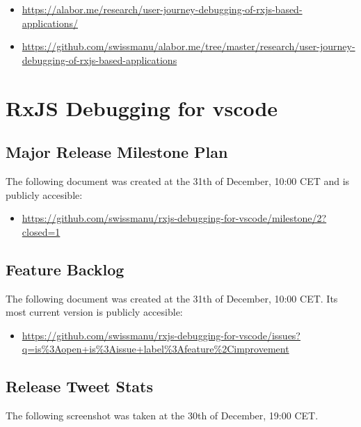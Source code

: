 \begin{itemize}
  \item \url{https://alabor.me/research/user-journey-debugging-of-rxjs-based-applications/}
  \item \url{https://github.com/swissmanu/alabor.me/tree/master/research/user-journey-debugging-of-rxjs-based-applications}
\end{itemize}





\section{RxJS Debugging for vscode}


\subsection{Major Release Milestone Plan}
\label{sec:major-milestone}
The following document was created at the 31th of December, 10:00 CET and is publicly accesible:

\begin{itemize}
  \item \url{https://github.com/swissmanu/rxjs-debugging-for-vscode/milestone/2?closed=1}
\end{itemize}






\subsection{Feature Backlog}
\label{sec:feature-backlog}
The following document was created at the 31th of December, 10:00 CET. Its most current version is publicly accesible:

\begin{itemize}
  \item \url{https://github.com/swissmanu/rxjs-debugging-for-vscode/issues?q=is%3Aopen+is%3Aissue+label%3Afeature%2Cimprovement}
\end{itemize}




\subsection{Release Tweet Stats}
\label{sec:release-tweet-stats}
The following screenshot was taken at the 30th of December, 19:00 CET.


